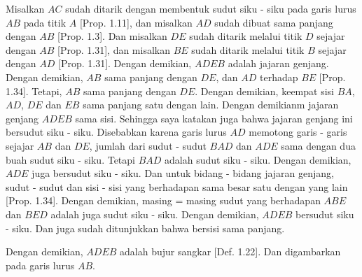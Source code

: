 \documentclass[a4paper]{book}
\begin{document}
Misalkan $AC$ sudah ditarik dengan membentuk sudut siku - siku  pada garis 
lurus $AB$ pada titik $A$ [Prop. 1.11], dan misalkan $AD$ sudah dibuat sama 
panjang dengan $AB$ [Prop. 1.3]. Dan misalkan $DE$ sudah ditarik melalui 
titik $D$ sejajar dengan $AB$ [Prop. 1.31], dan misalkan $BE$ sudah ditarik 
melalui titik $B$ sejajar dengan $AD$ [Prop. 1.31]. Dengan demikian, $ADEB$
adalah jajaran genjang. Dengan demikian, $AB$ sama panjang dengan $DE$, dan 
$AD$ terhadap $BE$ [Prop. 1.34]. Tetapi, $AB$ sama panjang dengan $DE$.
Dengan demikian, keempat sisi $BA$, $AD$, $DE$ dan $EB$ sama panjang satu 
dengan lain. Dengan demikianm jajaran genjang $ADEB$ sama sisi. Sehingga saya
katakan juga bahwa jajaran genjang ini bersudut siku - siku. Disebabkan karena
garis lurus $AD$ memotong garis - garis sejajar $AB$ dan $DE$, jumlah 
dari sudut - sudut $BAD$ dan $ADE$ sama dengan dua buah sudut siku - siku.
Tetapi $BAD$ adalah sudut siku - siku. Dengan demikian, $ADE$ juga bersudut
siku - siku. Dan untuk bidang - bidang jajaran genjang, sudut - sudut dan 
sisi - sisi yang berhadapan sama besar satu dengan yang lain [Prop. 1.34].
Dengan demikian, masing = masing sudut yang berhadapan $ABE$ dan $BED$ 
adalah juga sudut siku - siku. Dengan demikian, $ADEB$ bersudut siku - siku.
Dan juga sudah ditunjukkan bahwa bersisi sama panjang.

Dengan demikian, $ADEB$ adalah bujur sangkar [Def. 1.22]. Dan digambarkan
pada garis lurus $AB$.

\end{document}
